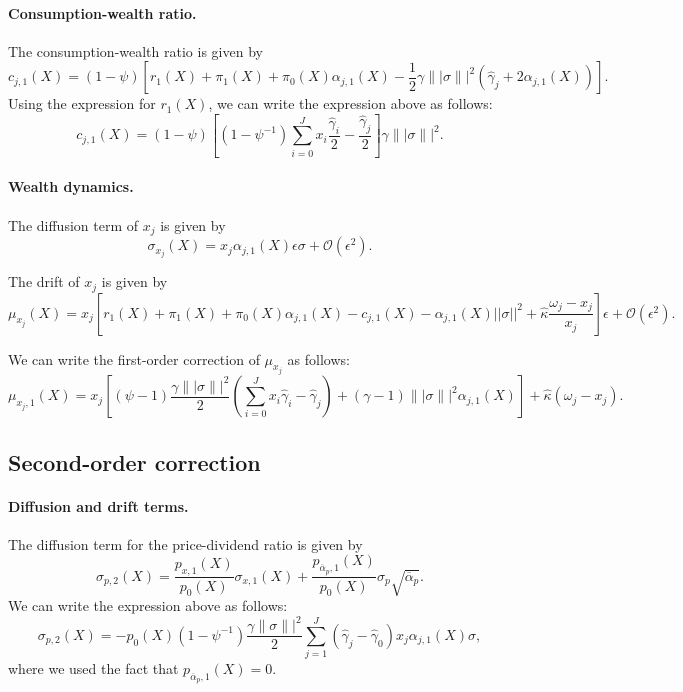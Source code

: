 \paragraph{Consumption-wealth ratio.} The consumption-wealth ratio is given by
\begin{equation}
    c_{j,1}(X) = (1-\psi) \left[ r_1(X) + \pi_1(X) + \pi_0(X) \alpha_{j,1}(X)  - \frac{1}{2} \gamma \||\sigma\||^2 (\hat{\gamma}_j + 2 \alpha_{j,1}(X))\right].
\end{equation}
Using the expression for $r_1(X)$, we can write the expression above as follows:
\begin{equation}
    c_{j,1}(X) = (1-\psi) \left[ (1-\psi^ {-1}) \sum_{i=0}^J x_i  \frac{\hat{\gamma}_i}{2}  - \frac{\hat{\gamma}_j }{2} \right] \gamma \||\sigma\||^2.
\end{equation}

\paragraph{Wealth dynamics.} The diffusion term of $x_j$ is given by
\begin{equation}
    \sigma_{x_j}(X) = x_j \alpha_{j,1}(X) \epsilon \sigma + \mathcal{O}(\epsilon^2).
\end{equation}

The drift of $x_j$ is given by
\begin{equation}
    \mu_{x_j}(X) = x_j\left[r_1(X) + \pi_1(X) + \pi_0(X) \alpha_{j,1}(X) - c_{j,1}(X)- \alpha_{j,1}(X)||\sigma||^2 + \hat{\kappa} \frac{\omega_j - x_j}{x_j} \right] \epsilon + \mathcal{O}(\epsilon^2).
\end{equation}

We can write the first-order correction of $\mu_{x_j}$ as follows:
\begin{equation}
    \mu_{x_j,1}(X) = x_j\left[(\psi-1) \frac{\gamma \||\sigma\||^ 2 }{2} \left(\sum_{i=0}^J x_i \hat{\gamma}_i -\hat{\gamma}_j \right) + (\gamma-1)\||\sigma\||^ 2 \alpha_{j,1}(X) \right] + \hat{\kappa} (\omega_j - x_j).
\end{equation}

\subsection{Second-order correction}

\paragraph{Diffusion and drift terms.} The diffusion term for the price-dividend ratio is given by
\begin{equation}
    \sigma_{p,2}(X) = \frac{p_{x,1}(X)}{p_0(X)} \sigma_{x,1}(X) + \frac{p_{\overline{\alpha}_p,1}(X)}{p_0(X)} \sigma_{p} \sqrt{\overline{\alpha}_{p}}.
\end{equation}
We can write the expression above as follows:
\begin{equation}
    \sigma_{p,2}(X) = - p_0(X) (1-\psi^{-1})\frac{\gamma \|\sigma\||^ 2}{2} \sum_{j=1}^J \left( \hat{\gamma}_j - \hat{\gamma}_0 \right) x_j \alpha_{j,1}(X) \sigma,
\end{equation}
where we used the fact that $p_{\overline{\alpha}_p,1}(X) = 0$.

